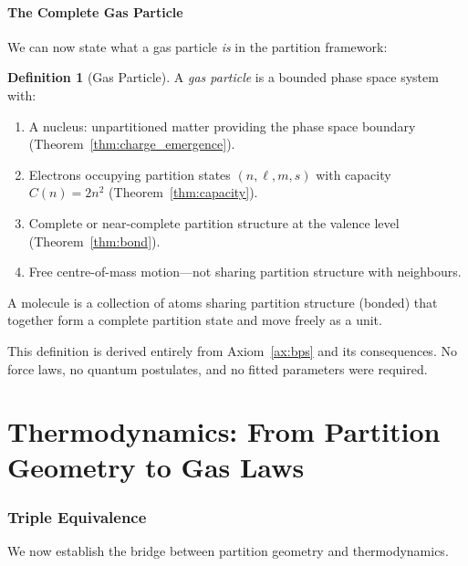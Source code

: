 \documentclass[twocolumn,10pt,a4paper]{article}
\theoremstyle{plain}
\theoremstyle{definition}
\newtheorem{definition}[theorem]{Definition}
\theoremstyle{remark}
\begin{document}
\subsection{The Complete Gas Particle}

We can now state what a gas particle \emph{is} in the partition framework:

\begin{definition}[Gas Particle]
\label{def:gas_particle}
A \emph{gas particle} is a bounded phase space system with:
\begin{enumerate}
    \item A nucleus: unpartitioned matter providing the phase space boundary (Theorem~\ref{thm:charge_emergence}).
    \item Electrons occupying partition states $(n, \ell, m, s)$ with capacity $C(n) = 2n^2$ (Theorem~\ref{thm:capacity}).
    \item Complete or near-complete partition structure at the valence level (Theorem~\ref{thm:bond}).
    \item Free centre-of-mass motion---not sharing partition structure with neighbours.
\end{enumerate}
A molecule is a collection of atoms sharing partition structure (bonded) that together form a complete partition state and move freely as a unit.
\end{definition}

This definition is derived entirely from Axiom~\ref{ax:bps} and its consequences. No force laws, no quantum postulates, and no fitted parameters were required.


\part{Thermodynamics: From Partition Geometry to Gas Laws}
\label{part:thermo}

\section{Triple Equivalence}
\label{sec:triple}

We now establish the bridge between partition geometry and thermodynamics.
\end{document}
